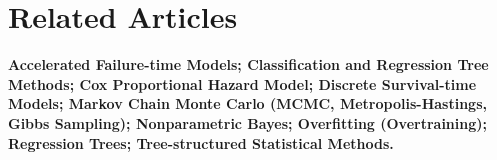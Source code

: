 \documentclass[cmbright,doublespace]{WileySTAT-V1}
\theoremstyle{plain}
\begin{document}
\begin{comment}
\MakeShortVerb{\|}

The first package was {\bf BayesTree} and it has been very influential
on packages that followed. It is written in C++ and supports
continuous and dichotomous outcomes.  Reported bugs will be fixed, but
no future improvements are planned. The second package, {\bf
  bartMachine}, is written in {java} \citep{KapeBlei16}.  It provides
advanced features like multi-threading, variable selection
\citep{BleiKape14}, a |predict| function, convergence diagnostics and
missing data handling.  The {R} to {java} interface is provided by the
{\bf rJava} \citep{Urba17} package which requires the Java Development
Kit (JDK) so we recommend {\bf bartMachine} for {java} users.

The third package, {\bf dbarts}, is also written in {C++}.  It is
designed as a drop-in replacement for {\bf BayesTree}.  Although, it
lacks multi-threading, the {\bf dbarts} serial implementation is the
fastest, therefore, it is preferable when multi-threading is
unavailable such as on Windows.  The last package, {\bf BART}, is
written in {C++}.  The {C++} interface to {R} is provided by the {\bf
  Rcpp} package \citep{EddeFran11} which seamlessly passes object
references from {R} to {C++} (and vice versa) as well as providing
direct accesss to the {R} random number generator. {\bf BART} provides
advanced features like multi-threading, variable selection
\citep{Line16}, a |predict| function, convergence diagnostics and
missing data handling.  It is the only BART package to support
continuous, dichotmous, categorical and time-to-event outcomes
\citep{SparLoga16} including recurrent events \citep{SparRein18} and
competing risks \citep{SparLoga19}.
\end{comment}

\section*{Related Articles}

\textbf{Accelerated Failure-time Models; Classification and Regression
  Tree Methods; Cox Proportional Hazard Model; Discrete Survival-time
  Models; Markov Chain Monte Carlo (MCMC, Metropolis-Hastings, Gibbs
  Sampling); Nonparametric Bayes; Overfitting (Overtraining);
  Regression Trees; Tree-structured Statistical Methods.}

%


\end{document}

